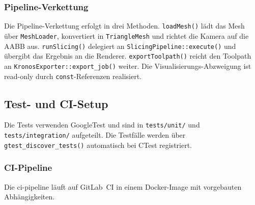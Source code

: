             \subsubsection{Pipeline-Verkettung}\label{subsubsec:impl-medusa-pipeline-wiring}
                Die Pipeline-Verkettung erfolgt in drei Methoden.
                \texttt{loadMesh()} lädt das Mesh über \texttt{MeshLoader}, konvertiert in \texttt{TriangleMesh} und richtet die Kamera auf die \ac{AABB} aus.
                \texttt{runSlicing()} delegiert an \texttt{SlicingPipeline::execute()} und übergibt das Ergebnis an die Renderer.
                \texttt{exportToolpath()} reicht den Toolpath an \texttt{KronosExporter::\allowbreak export\_job()} weiter.
                Die Visualisierungs-Abzweigung ist read-only durch \texttt{const}-Referenzen realisiert.

        \subsection{Test- und CI-Setup}\label{subsec:impl-medusa-testing}
            Die Tests verwenden GoogleTest und sind in \texttt{tests/unit/} und \texttt{tests/integration/} aufgeteilt.
            Die Testfälle werden über \texttt{gtest\_discover\_tests()} automatisch bei CTest registriert.

            \subsubsection{CI-Pipeline}\label{subsubsec:impl-medusa-ci-pipeline}
                Die \gls{ci-pipeline} läuft auf GitLab~CI in einem Docker-Image mit vorgebauten Abhängigkeiten.

